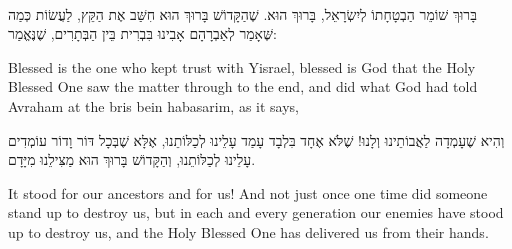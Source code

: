 \ \\

בָּרוּךְ שׁוֹמֵר הַבְטָחָתוֹ לְיִשְׂרָאֵל, בָּרוּךְ הוּא. שֶׁהַקָּדוֹשׁ בָּרוּךְ הוּא חִשַּׁב אֶת הַקֵּץ, לַעֲשׂוֹת כְּמַה שֶּׁאָמַר לְאַבְרָהָם אָבִינוּ בִּבְרִית בֵּין הַבְּתָרִים, שֶׁנֶּאֱמַר: 

\begin{english}
Blessed is the one who kept trust with Yisrael, blessed is God that the Holy Blessed One saw the matter through to the end, and did what God had told Avraham at the bris bein habasarim, as it says, 
\end{english}

\break


וְהִיא שֶׁעָמְדָה לַאֲבוֹתֵינוּ וְלָנוּ! שֶׁלֹּא אֶחָד בִּלְבָד עָמַד עָלֵינוּ לְכַלּוֹתֵנוּ, אֶלָּא שֶׁבְּכָל דּוֹר וָדוֹר עוֹמְדִים עָלֵינוּ לְכַלּוֹתֵנוּ, וְהַקָּדוֹשׁ בָּרוּךְ הוּא מַצִּילֵנוּ מִיָּדָם.

\begin{english}
It stood for our ancestors and for us! And not just once one time did someone stand up to destroy us, but in each and every generation our enemies have stood up to destroy us, and the Holy Blessed One has delivered us from their hands.
\end{english}


\ \\



